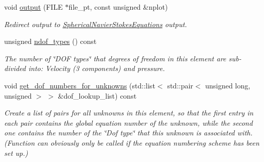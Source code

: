 \begin{DoxyCompactItemize}
void \hyperlink{classoomph_1_1QSphericalTaylorHoodElement_ad8e462b97fd0aa1d0000e3440259ef61}{output} (F\+I\+LE $\ast$file\+\_\+pt, const unsigned \&nplot)
\begin{DoxyCompactList}\small\item\em Redirect output to \hyperlink{classoomph_1_1SphericalNavierStokesEquations}{Spherical\+Navier\+Stokes\+Equations} output. \end{DoxyCompactList}\item 
unsigned \hyperlink{classoomph_1_1QSphericalTaylorHoodElement_a3417f97997b87a5cddc499697e227717}{ndof\+\_\+types} () const
\begin{DoxyCompactList}\small\item\em The number of \char`\"{}\+D\+O\+F types\char`\"{} that degrees of freedom in this element are sub-\/divided into\+: Velocity (3 components) and pressure. \end{DoxyCompactList}\item 
void \hyperlink{classoomph_1_1QSphericalTaylorHoodElement_a62c62fd109c074654a239bcfb99522c6}{get\+\_\+dof\+\_\+numbers\+\_\+for\+\_\+unknowns} (std\+::list$<$ std\+::pair$<$ unsigned long, unsigned $>$ $>$ \&dof\+\_\+lookup\+\_\+list) const
\begin{DoxyCompactList}\small\item\em Create a list of pairs for all unknowns in this element, so that the first entry in each pair contains the global equation number of the unknown, while the second one contains the number of the \char`\"{}\+Dof type\char`\"{} that this unknown is associated with. (Function can obviously only be called if the equation numbering scheme has been set up.) \end{DoxyCompactList}\end{DoxyCompactItemize}

